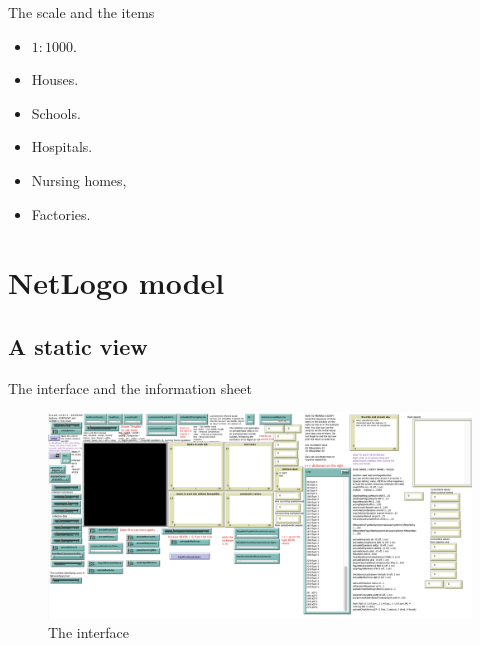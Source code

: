 \documentclass[8pt]{beamer}
\begin{document}
\begin{frame}{The scale and the items}

\begin{itemize}

\item $1:1000$.

\bigskip

\item Houses.
\item Schools.
\item Hospitals.
\item Nursing homes,
\item Factories.

\end{itemize}

\end{frame}
\section{NetLogo model}

\subsection{A static view}

\begin{frame}{The interface and the information sheet}

\begin{figure}[H]
\center
\includegraphics[scale=0.26]{interfaceB.png}

\caption{The interface} 
\label{interface}
\end{figure}

\end{frame}
\end{document}
